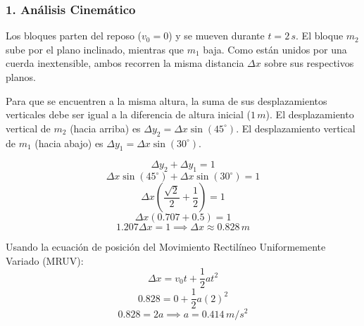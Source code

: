 \documentclass[12pt, a4paper]{article}
\begin{document}
\subsubsection*{1. Análisis Cinemático}
Los bloques parten del reposo ($v_0 = 0$) y se mueven durante $t = 2 \, \si{s}$. El bloque $m_2$ sube por el plano inclinado, mientras que $m_1$ baja. Como están unidos por una cuerda inextensible, ambos recorren la misma distancia $\Delta x$ sobre sus respectivos planos.

Para que se encuentren a la misma altura, la suma de sus desplazamientos verticales debe ser igual a la diferencia de altura inicial ($1 \, \si{m}$).
El desplazamiento vertical de $m_2$ (hacia arriba) es $\Delta y_2 = \Delta x \sin(45^\circ)$.
El desplazamiento vertical de $m_1$ (hacia abajo) es $\Delta y_1 = \Delta x \sin(30^\circ)$.

$$ \Delta y_2 + \Delta y_1 = 1 $$
$$ \Delta x \sin(45^\circ) + \Delta x \sin(30^\circ) = 1 $$
$$ \Delta x \left( \frac{\sqrt{2}}{2} + \frac{1}{2} \right) = 1 $$
$$ \Delta x (0.707 + 0.5) = 1 $$
$$ 1.207 \Delta x = 1 \implies \Delta x \approx 0.828 \, \si{m} $$

Usando la ecuación de posición del Movimiento Rectilíneo Uniformemente Variado (MRUV):
$$ \Delta x = v_0 t + \frac{1}{2} a t^2 $$
$$ 0.828 = 0 + \frac{1}{2} a (2)^2 $$
$$ 0.828 = 2 a \implies a = 0.414 \, \si{m/s^2} $$
\end{document}
